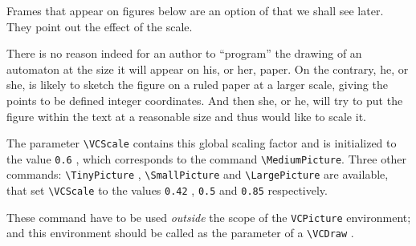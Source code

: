 \documentclass[11pt,twoside]{article}
\newcommand{\noi}{\noindent}
\begin{document}
\medskip
\noi 
Frames that appear on figures below are an option of \VCSG that we
shall see later. They point out the effect of the scale.

\medskip
\noi 
There is no reason indeed for an author to ``program'' the drawing of 
an automaton at the size it will appear on his, or her, 
paper. 
On the contrary, he, or she, is likely to sketch the figure on a 
ruled paper at a larger scale, giving the points to be defined integer 
coordinates.
And then she, or he, will try to put the figure within the text at a 
reasonable size and thus would like to scale it.

The parameter \verb+\VCScale+ contains this global scaling factor and is
initialized to the value \verb+0.6+ , which corresponds to the 
command \verb+\MediumPicture+.
Three other commands: 
\verb+\TinyPicture+ ,
\verb+\SmallPicture+ and
\verb+\LargePicture+
are available, that set \verb+\VCScale+ to the values 
\verb+0.42+ ,
\verb+0.5+ and
\verb+0.85+ respectively.

These command have to be used \emph{outside} the scope of the 
\verb+VCPicture+ environment; and this environment should be called 
as the parameter of a \verb+\VCDraw+ .
\end{document}
